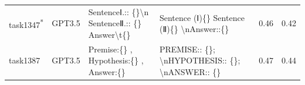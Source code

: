 \begin{longtable}{@{}p{0.8cm\tiny}p{1cm\tiny}p{4.1cm\ttfamily\tiny}p{4.1cm\ttfamily\tiny}p{0.8cm\tiny}p{0.8cm\tiny}@{}}
task1347\textsuperscript{*}  & GPT3.5    & SentenceⅠ.:: \{\}\textbackslash{}n SentenceⅡ.:: \{\} Answer\textbackslash{}t\{\}                                                                                                                                                                                                                                                                                                                                                                                                                                        & Sentence (Ⅰ)\{\} Sentence (Ⅱ)\{\} \textbackslash{}nAnswer::\{\}                                                                                                                                                                                                                                                                                                                                                                                                                                                                                                                   & 0.46 & 0.42 \\
task1387  & GPT3.5    & Premise:\{\} ,  Hypothesis:\{\} ,  Answer:\{\}                                                                                                                                                                                                                                                                                                                                                                                                                                                                          & PREMISE:: \{\}; \textbackslash{}nHYPOTHESIS:: \{\}; \textbackslash{}nANSWER:: \{\}                                                                                                                                                                                                                                                                                                                                                                                                                                                                                                & 0.47 & 0.44 \\

\end{longtable}
